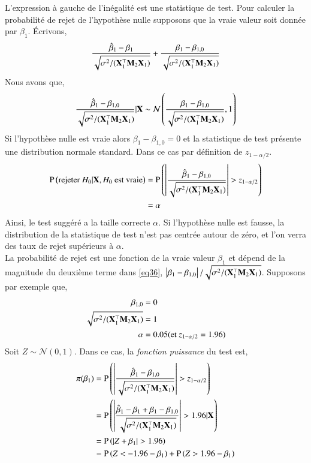 \documentclass[10pt, reqno]{amsart}
\begin{document}
L'expression à gauche de l'inégalité est une statistique de test. Pour calculer la probabilité de rejet de l'hypothèse nulle supposons que la vraie valeur soit donnée par $\beta_1$. \'Ecrivons, 
\begin{align}
\frac{\hat{\beta}_1 - \beta_1}{ \sqrt{\sigma^2/(\mathbf X_1^\top\mathbf M_2\mathbf X_1)}} + 
\frac{\beta_1 - \beta_{1,0}}{ \sqrt{\sigma^2/(\mathbf X_1^\top\mathbf M_2\mathbf X_1)}} 
\label{eq36}
\end{align}
Nous avons que,
\begin{align*}
\frac{\hat{\beta}_1 - \beta_{1,0}}{ \sqrt{\sigma^2/(\mathbf X_1^\top\mathbf M_2\mathbf X_1)}} | \mathbf X
 \sim
 \mathcal{N}\left( \frac{\beta_1 - \beta_{1,0}}{ \sqrt{\sigma^2/(\mathbf X_1^\top\mathbf M_2\mathbf X_1)}}, 1 \right) 
\end{align*}
Si l'hypothèse nulle est vraie alors $\beta_1-\beta_{1,0} = 0$ et la statistique de test présente une distribution normale standard. Dans ce cas par définition de $z_{1-\alpha/2}$.
\begin{align*}
\operatorname{P}\left(\textrm{rejeter} \ H_0 | \mathbf X, H_0 \ \textrm{est vraie}\right) &= 
\operatorname{P}\left(\left\vert {\frac{\hat{\beta}_1 - \beta_{1,0}}{ \sqrt{\sigma^2/(\mathbf X_1^\top\mathbf M_2\mathbf X_1)}}} \right\vert > z_{1-\alpha/2}\right)\\
&= \alpha
\end{align*}
Ainsi, le test suggéré a la taille correcte $\alpha$. Si l'hypothèse nulle est fausse, la distribution de la statistique de test n'est pas centrée autour de zéro, et l'on verra des taux de rejet supérieurs à $\alpha$.\\
La probabilité de rejet est une fonction de la vraie valeur $\beta_1$ et dépend de la magnitude du deuxième terme dans \eqref{eq36}, $\left\vert {\beta_1 - \beta_{1,0}} \right\vert/ \sqrt{\sigma^2/(\mathbf X_1^\top\mathbf M_2\mathbf X_1)}$. Supposons par exemple que,
\begin{align*}
\beta_{1,0} &= 0\\
 \sqrt{\sigma^2/(\mathbf X_1^\top\mathbf M_2\mathbf X_1)} &=1\\
 \alpha &=0.05(\textrm{et} \ z_{1-\alpha/2} = 1.96) 
\end{align*}
Soit $Z \sim \mathcal{N}(0,1)$. Dans ce cas, la \emph{fonction puissance} du test est,
\begin{align*}
\pi(\beta_1) &= \operatorname{P}\left( \left\vert {\frac{\hat{\beta}_1 - \beta_{1,0}}{ \sqrt{\sigma^2/(\mathbf X_1^\top\mathbf M_2\mathbf X_1)}}} \right\vert > z_{1-\alpha/2} \right)\\
&= \operatorname{P}\left( \left\vert {\frac{\hat{\beta}_1 - \beta_1+\beta_1 -\beta_{1,0}}{ \sqrt{\sigma^2/(\mathbf X_1^\top\mathbf M_2\mathbf X_1)}}} \right\vert > 1.96 | \mathbf X \right)\\
&=\operatorname{P}\left(\left\vert {Z + \beta_1} \right\vert > 1.96\right)\\
&= \operatorname{P}\left( Z < -1.96 - \beta_1\right)+ \operatorname{P}\left( Z > 1.96 - \beta_1\right)
\end{align*}
\end{document}
